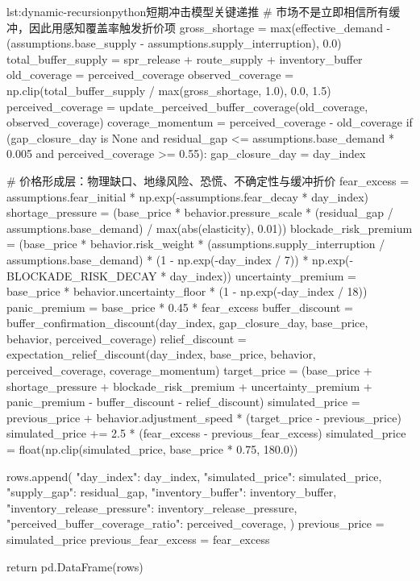 \begin{paperlisting}{lst:dynamic-recursion}{python}{短期冲击模型关键递推}
        # 市场不是立即相信所有缓冲，因此用感知覆盖率触发折价项
        gross_shortage = max(effective_demand - (assumptions.base_supply
                                                 - assumptions.supply_interruption), 0.0)
        total_buffer_supply = spr_release + route_supply + inventory_buffer
        old_coverage = perceived_coverage
        observed_coverage = np.clip(total_buffer_supply / max(gross_shortage, 1.0), 0.0, 1.5)
        perceived_coverage = update_perceived_buffer_coverage(old_coverage, observed_coverage)
        coverage_momentum = perceived_coverage - old_coverage
        if (gap_closure_day is None
                and residual_gap <= assumptions.base_demand * 0.005
                and perceived_coverage >= 0.55):
            gap_closure_day = day_index

        # 价格形成层：物理缺口、地缘风险、恐慌、不确定性与缓冲折价
        fear_excess = assumptions.fear_initial * np.exp(-assumptions.fear_decay * day_index)
        shortage_pressure = (base_price * behavior.pressure_scale
                             * (residual_gap / assumptions.base_demand)
                             / max(abs(elasticity), 0.01))
        blockade_risk_premium = (base_price * behavior.risk_weight
                                 * (assumptions.supply_interruption / assumptions.base_demand)
                                 * (1 - np.exp(-day_index / 7))
                                 * np.exp(-BLOCKADE_RISK_DECAY * day_index))
        uncertainty_premium = base_price * behavior.uncertainty_floor * (1 - np.exp(-day_index / 18))
        panic_premium = base_price * 0.45 * fear_excess
        buffer_discount = buffer_confirmation_discount(day_index, gap_closure_day,
                                                       base_price, behavior, perceived_coverage)
        relief_discount = expectation_relief_discount(day_index, base_price, behavior,
                                                      perceived_coverage, coverage_momentum)
        target_price = (base_price + shortage_pressure + blockade_risk_premium
                        + uncertainty_premium + panic_premium
                        - buffer_discount - relief_discount)
        simulated_price = previous_price + behavior.adjustment_speed * (target_price - previous_price)
        simulated_price += 2.5 * (fear_excess - previous_fear_excess)
        simulated_price = float(np.clip(simulated_price, base_price * 0.75, 180.0))

        rows.append({
            "day_index": day_index,
            "simulated_price": simulated_price,
            "supply_gap": residual_gap,
            "inventory_buffer": inventory_buffer,
            "inventory_release_pressure": inventory_release_pressure,
            "perceived_buffer_coverage_ratio": perceived_coverage,
        })
        previous_price = simulated_price
        previous_fear_excess = fear_excess

    return pd.DataFrame(rows)
\end{paperlisting}

\clearpage
